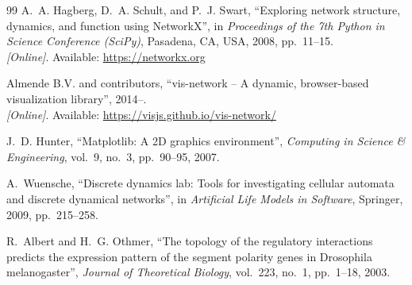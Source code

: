 \documentclass[oneside,final]{hcmut-report}
\begin{document}
\begin{thebibliography}{99}
A.~A. Hagberg, D.~A. Schult, and P.~J. Swart,
``Exploring network structure, dynamics, and function using NetworkX'',
in \textit{Proceedings of the 7th Python in Science Conference (SciPy)}, Pasadena, CA, USA, 2008, pp.~11--15.
\\\textit{[Online]}. Available: \url{https://networkx.org}

Almende B.V. and contributors,
``vis-network -- A dynamic, browser-based visualization library'', 2014--.
\\\textit{[Online]}. Available: \url{https://visjs.github.io/vis-network/}

J.~D. Hunter,
``Matplotlib: A 2D graphics environment'',
\textit{Computing in Science \& Engineering}, vol.~9, no.~3, pp.~90--95, 2007.

A.~Wuensche,
``Discrete dynamics lab: Tools for investigating cellular automata and discrete dynamical networks'',
in \textit{Artificial Life Models in Software}, Springer, 2009, pp.~215--258.

R.~Albert and H.~G. Othmer,
``The topology of the regulatory interactions predicts the expression pattern of the segment polarity genes in Drosophila melanogaster'',
\textit{Journal of Theoretical Biology}, vol.~223, no.~1, pp.~1--18, 2003.

\end{thebibliography}
\end{document}
